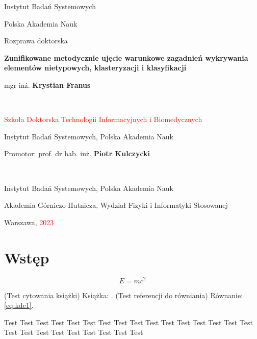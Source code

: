 \documentclass[12pt,a4paper,oneside]{book}
\theoremstyle{definition}
\begin{document}

\begin{titlepage}

\centering
Instytut Badań Systemowych

Polska Akademia Nauk

\vspace{2cm}
Rozprawa doktorska

\vspace{3cm}
{\Large \textbf{Zunifikowane metodycznie ujęcie warunkowe zagadnień wykrywania elementów nietypowych, klasteryzacji i klasyfikacji}}

\vspace{2cm}
{\large mgr inż. \textbf{Krystian Franus}}
\par~\par
\textcolor{red}{Szkoła Doktorska Technologii Informacyjnych i Biomedycznych}

Instytut Badań Systemowych, Polska Akademia Nauk

\vfill	
Promotor: prof. dr hab. inż. \textbf{Piotr Kulczycki}
\par~\par
Instytut Badań Systemowych, Polska Akademia Nauk

Akademia Górniczo-Hutnicza, Wydział Fizyki i Informatyki Stosowanej

\vfill
Warszawa, \textcolor{red}{2023}
\end{titlepage}


\tableofcontents
\setcounter{page}{2}  %



\chapter{Wstęp}

\[ E=mc^2 \]

(Test cytowania książki) Książka: \cite{Silverman_1986}. (Test referencji do równiania) Równanie: \eqref{eq:kde1}.

\newpage
Test Test Test Test Test Test Test Test Test Test Test Test Test Test Test Test Test Test Test Test Test Test Test Test Test
\end{document}
